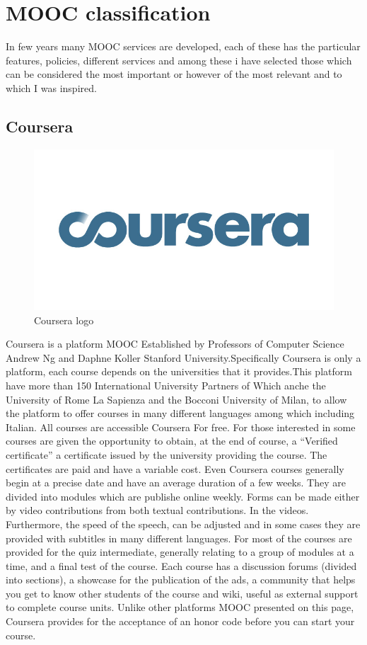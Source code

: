 \section{MOOC classification}
\label{sec:mooc_classification}

In few years many MOOC services are developed, each of these has the particular features, policies, different services and among these i have selected those which can be considered the most important or however of the most relevant and to which I was inspired.

\subsection{Coursera}
\label{subsec:coursera}

\begin{figure}[htb] %
 \centering
 \includegraphics[width=0.5\linewidth]{images/chapter1/coursera.jpg}\hfill
 \caption[Coursera logo]{Coursera logo}
 \label{fig:fourV}
\end{figure}

Coursera is a platform MOOC Established by Professors of Computer Science Andrew Ng and Daphne Koller Stanford University.Specifically Coursera is only a platform, each course depends on the universities that it provides.This platform have more than 150 International  University Partners of Which anche the University of Rome La Sapienza and the Bocconi University of Milan, to allow the platform to offer courses in many different languages among which including Italian. All courses are accessible Coursera For free.
For those interested in some courses are given the opportunity to obtain, at the end of course, a “Verified certificate” a certificate issued by the university providing the course. The certificates are paid and have a variable cost.
Even Coursera courses generally begin at a precise date and have an average duration of a few weeks. They are divided into modules which are publishe online weekly. Forms can be made either by video contributions from both textual contributions. In the videos. Furthermore, the speed of the speech, can be adjusted and in some cases they are provided with subtitles in many different languages.
For most of the courses are provided for the quiz intermediate, generally relating to a group of modules at a time, and a final test of the course.
Each course has a discussion forums (divided into sections), a showcase for the publication of the ads, a community that helps you get to know other students of the course and wiki, useful as external support to complete course units. Unlike other platforms MOOC presented on this page, Coursera provides for the acceptance of an honor code before you can start your course.

